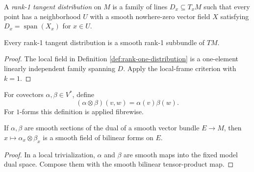 \begin{definition}
\label{def:rank-one-distribution}




A \emph{rank-1 tangent distribution} on $M$ is a family of lines
$D_x\subseteq T_xM$ such that every point has a neighborhood $U$ with a smooth
nowhere-zero vector field $X$ satisfying $D_x=\operatorname{span}(X_x)$ for
$x\in U$.
\end{definition}

\begin{proposition}
\label{prop:rank-one-distribution-is-subbundle}





Every rank-1 tangent distribution is a smooth rank-1 subbundle of $TM$.
\end{proposition}

\begin{proof}

\sketch The local field in Definition \ref{def:rank-one-distribution} is a
one-element linearly independent family spanning $D$. Apply the local-frame
criterion with $k=1$.
\end{proof}

\begin{definition}
\label{def:tensor-product-one-forms}




For covectors $\alpha,\beta\in V^*$, define
\[
(\alpha\otimes\beta)(v,w)=\alpha(v)\beta(w).
\]
For $1$-forms this definition is applied fibrewise.
\end{definition}

\begin{lemma}
\label{lem:tensor-product-one-forms-smooth}





If $\alpha,\beta$ are smooth sections of the dual of a smooth vector bundle
$E\to M$, then $x\mapsto\alpha_x\otimes\beta_x$ is a smooth field of bilinear
forms on $E$.
\end{lemma}

\begin{proof}

\sketch In a local trivialization, $\alpha$ and $\beta$ are smooth maps into the
fixed model dual space. Compose them with the smooth bilinear tensor-product map.
\end{proof}

